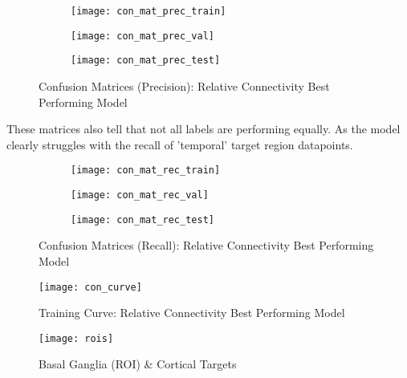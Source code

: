 \begin{figure}[H]
\centering
\begin{subfigure}{0.49\textwidth}
  \centering
  \texttt{[image: con\_mat\_prec\_train]}
\end{subfigure}
\hfill
\begin{subfigure}{0.49\textwidth}
  \centering
  \texttt{[image: con\_mat\_prec\_val]}
\end{subfigure}
\begin{subfigure}{0.49\textwidth}
  \centering
  \texttt{[image: con\_mat\_prec\_test]}
\end{subfigure}
\caption{Confusion Matrices (Precision): Relative Connectivity Best Performing Model}
\label{fig:conf_prec}
\end{figure}

These matrices also tell that not all labels are performing equally. As the model clearly struggles with the recall of 'temporal' target region datapoints.

\begin{figure}[H]
\centering
\begin{subfigure}{0.49\textwidth}
  \centering
  \texttt{[image: con\_mat\_rec\_train]}
\end{subfigure}
\hfill
\begin{subfigure}{0.49\textwidth}
  \centering
  \texttt{[image: con\_mat\_rec\_val]}
\end{subfigure}
\begin{subfigure}{0.49\textwidth}
  \centering
  \texttt{[image: con\_mat\_rec\_test]}
\end{subfigure}
\caption{Confusion Matrices (Recall): Relative Connectivity Best Performing Model}
\label{fig:conf_rec}
\end{figure}

\begin{figure}[H]
\centering
\texttt{[image: con\_curve]}
\caption{Training Curve: Relative Connectivity Best Performing Model}
\label{fig:curve-con}
\end{figure}

\begin{figure}[H]
\centering
\texttt{[image: rois]}
\caption{Basal Ganglia (ROI) \& Cortical Targets}
\label{fig:rois}
\end{figure}

